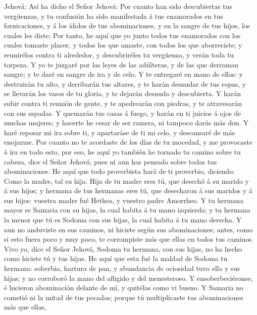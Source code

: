 Jehová:  Así ha dicho el Señor Jehová: Por cuanto han sido
descubiertas tus vergüenzas, y tu confusión ha sido manifestada á tus
enamorados en tus fornicaciones, y á los ídolos de tus abominaciones, y
en la sangre de tus hijos, los cuales les diste;  Por
tanto, he aquí que yo junto todos tus enamorados con los cuales tomaste
placer, y todos los que amaste, con todos los que aborreciste; y
reunirélos contra ti alrededor, y descubriréles tu vergüenza, y verán
toda tu torpeza.  Y yo te juzgaré por las leyes de las
adúlteras, y de las que derraman sangre; y te daré en sangre de ira y de
celo.  Y te entregaré en mano de ellos: y destruirán tu
alto, y derribarán tus altares, y te harán desnudar de tus ropas, y se
llevarán los vasos de tu gloria, y te dejarán desnuda y descubierta.
 Y harán subir contra ti reunión de gente, y te apedrearán
con piedras, y te atravesarán con sus espadas.  Y quemarán
tus casas á fuego, y harán en ti juicios á ojos de muchas mujeres; y
hacerte he cesar de ser ramera, ni tampoco darás más don. 
Y haré reposar mi ira sobre ti, y apartaráse de ti mi celo, y descansaré
de más enojarme.  Por cuanto no te acordaste de los días de
tu mocedad, y me provocaste á ira en todo esto, por eso, he aquí yo
también he tornado tu camino sobre tu cabeza, dice el Señor Jehová; pues
ni aun has pensado sobre todas tus abominaciones.  He aquí
que todo proverbista hará de ti proverbio, diciendo: Como la madre, tal
su hija.  Hija de tu madre eres tú, que desechó á su marido
y á sus hijos; y hermana de tus hermanas eres tú, que desecharon á sus
maridos y á sus hijos: vuestra madre fué Hethea, y vuestro padre
Amorrheo.  Y tu hermana mayor es Samaria con su hijas, la
cual habita á tu mano izquierda; y tu hermana la menor que tú es Sodoma
con sus hijas, la cual habita á tu mano derecha.  Y aun no
anduviste en sus caminos, ni hiciste según sus abominaciones; antes,
como si esto fuera poco y muy poco, te corrompiste más que ellas en
todos tus caminos.  Vivo yo, dice el Señor Jehová, Sodoma
tu hermana, con sus hijas, no ha hecho como hiciste tú y tus hijas.
 He aquí que esta fué la maldad de Sodoma tu hermana:
soberbia, hartura de pan, y abundancia de ociosidad tuvo ella y sus
hijas; y no corroboró la mano del afligido y del menesteroso.
 Y ensoberbeciéronse, é hicieron abominación delante de mí,
y quitélas como vi bueno.  Y Samaria no cometió ni la mitad
de tus pecados; porque tú multiplicaste tus abominaciones más que ellas,
